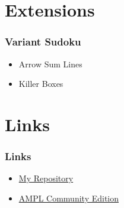 \documentclass{beamer}
\begin{document}
    \section{Extensions}
    \begin{frame}
        \frametitle{Variant Sudoku}
        \begin{itemize}
            \item Arrow Sum Lines
            \item Killer Boxes
        \end{itemize}
    \end{frame}
    \section{Links}
    \begin{frame}
        \frametitle{Links}
        \begin{itemize}
            \item \href{https://github.com/jprhyne/AMPLInsideC}{My Repository}
            \item \href{https://ampl.com/ce}{AMPL Community Edition}
        \end{itemize}
    \end{frame}
\end{document}
